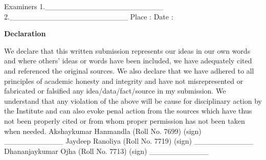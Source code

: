 \documentclass[12pt]{report}
\begin{document}
\vspace*{50px}
\hspace*{280px}
Examiners
\newline
\newline
\hspace*{280px} {1.\_\_\_\_\_\_\_\_\_\_\_\_\_\_\_\_\_\_\_\_\_\_}
\newline
\newline
\hspace*{280px}
{2.\_\_\_\_\_\_\_\_\_\_\_\_\_\_\_\_\_\_\_\_\_\_}
\newline
\vspace*{50px}
\newline
Place :
\newline
Date :
\newpage
\begin{center}
\begin{Huge}
\textbf{ Declaration }
\end{Huge}
\end{center}
\vspace*{50px}
We declare that this written submission represents our ideas in our own words and where others’ ideas or words have been included, we have adequately cited and referenced the original sources. We also declare that we have adhered to all principles of academic honesty and integrity and have not misrepresented or fabricated or falsified any idea/data/fact/source in my submission. We understand that any violation of the above will be cause for disciplinary action by the Institute and can also evoke penal action from the sources which have thus not been properly cited or from whom proper permission has not been taken when needed.
\vspace*{120px}
\hspace*{240px}
\newline 
\hspace*{140px}
Akshaykumar Hanmandla (Roll No. 7699) (sign) \_\_\_\_\_\_\_\_\_\_\_
\newline 
\hspace*{140px} 
Jaydeep Ranoliya    (Roll No. 7719) (sign) 
\hspace*{40px} 
\_\_\_\_\_\_\_\_\_\_\_
\newline 
\hspace*{140px} 
 Dhananjaykumar Ojha   (Roll No.  7713) (sign) 
\hspace*{20px} 
\_\_\_\_\_\_\_\_\_\_\_
\newline
\newline
\newline
\newline
\end{document}
